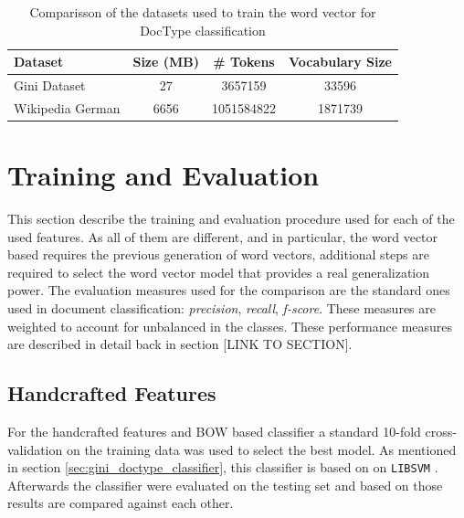 \begin{table}[h]

  \centering
  \caption{Comparisson of the datasets used to train the word vector for
    \ac{DocType} classification}
  \label{tab:w2v4tc_dataset_comparisson}

\small
\begin{tabular}{|l|c|c|c|}
\hline
Dataset           &  Size (MB)  &    \# Tokens  &  Vocabulary  Size  \\
\hline
 Gini Dataset      &         27  &     3657159  &             33596  \\
 Wikipedia German  &       6656  &  1051584822  &           1871739  \\
\hline
\end{tabular}

\end{table}


\section{Training and Evaluation}
\label{sec:w2v4tc_training-evaluation}

This section describe the training and evaluation procedure used for each of
the used features. As all of them are different, and in
particular, the word vector based requires  the previous generation
of word vectors, additional steps are required to select the word
vector model that provides a real generalization power.  
The evaluation measures used for the comparison  are the standard ones used in document
classification: \textit{precision}, \textit{recall}, \textit{f-score}. These
measures are  weighted to account for unbalanced in the classes. These
performance measures are described in detail back in section [LINK TO SECTION].




\subsection{Handcrafted Features}

For the handcrafted features and \ac{BOW} based classifier a standard 10-fold
cross-validation  on the training data  was used to select the best model.
As mentioned in section \ref{sec:gini_doctype_classifier}, this classifier is
based on  on \texttt{LIBSVM} \cite{CC01a}.
Afterwards the classifier were evaluated on the testing set and based on
those results are compared against each other.

